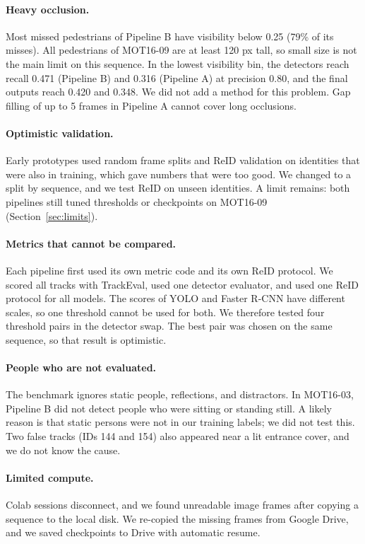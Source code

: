 \documentclass[11pt,letterpaper]{article}
\begin{document}
\paragraph{Heavy occlusion.}
Most missed pedestrians of Pipeline B have visibility below 0.25 (79\% of its misses).
All pedestrians of MOT16-09 are at least 120 px tall, so small size is not the main limit on this sequence.
In the lowest visibility bin, the detectors reach recall 0.471 (Pipeline B) and 0.316 (Pipeline A) at precision 0.80, and the final outputs reach 0.420 and 0.348.
We did not add a method for this problem.
Gap filling of up to 5 frames in Pipeline A cannot cover long occlusions.

\paragraph{Optimistic validation.}
Early prototypes used random frame splits and ReID validation on identities that were also in training, which gave numbers that were too good.
We changed to a split by sequence, and we test ReID on unseen identities.
A limit remains: both pipelines still tuned thresholds or checkpoints on MOT16-09 (Section~\ref{sec:limits}).

\paragraph{Metrics that cannot be compared.}
Each pipeline first used its own metric code and its own ReID protocol.
We scored all tracks with TrackEval, used one detector evaluator, and used one ReID protocol for all models.
The scores of YOLO and Faster R-CNN have different scales, so one threshold cannot be used for both.
We therefore tested four threshold pairs in the detector swap.
The best pair was chosen on the same sequence, so that result is optimistic.

\paragraph{People who are not evaluated.}
The benchmark ignores static people, reflections, and distractors.
In MOT16-03, Pipeline B did not detect people who were sitting or standing still.
A likely reason is that static persons were not in our training labels; we did not test this.
Two false tracks (IDs 144 and 154) also appeared near a lit entrance cover, and we do not know the cause.

\paragraph{Limited compute.}
Colab sessions disconnect, and we found unreadable image frames after copying a sequence to the local disk.
We re-copied the missing frames from Google Drive, and we saved checkpoints to Drive with automatic resume.
\end{document}

